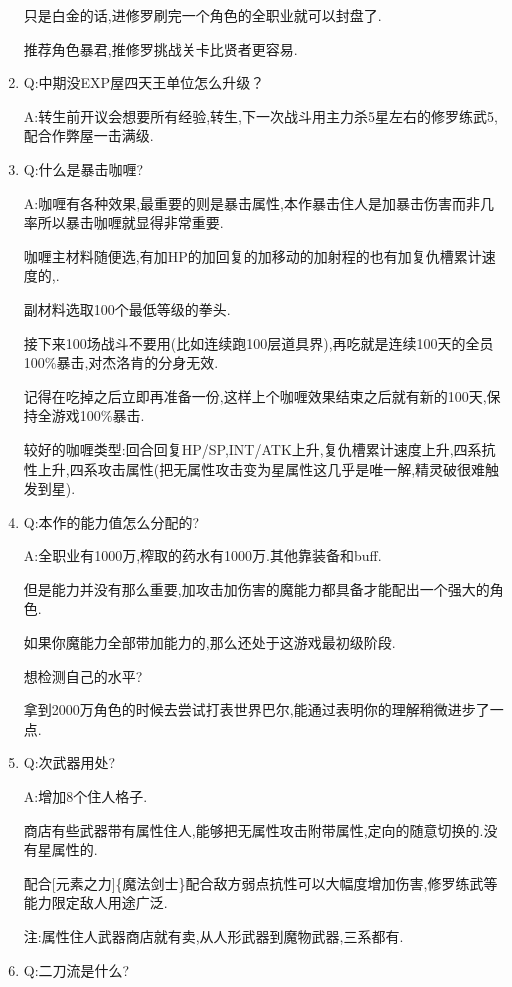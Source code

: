 \begin{enumerate}
	只是白金的话,进修罗刷完一个角色的全职业就可以封盘了.

	推荐角色暴君,推修罗挑战关卡比贤者更容易.

	\item
	Q:中期没EXP屋四天王单位怎么升级？

	A:转生前开议会想要所有经验,转生,下一次战斗用主力杀5星左右的修罗练武5,配合作弊屋一击满级.

	\item
	Q:什么是暴击咖喱?
	
	A:咖喱有各种效果,最重要的则是暴击属性,本作暴击住人是加暴击伤害而非几率所以暴击咖喱就显得非常重要.

	咖喱主材料随便选,有加HP的加回复的加移动的加射程的也有加复仇槽累计速度的,{\color{red}{也有开局自带异常状态的}}.

	副材料选取100个最低等级的拳头.

	接下来100场战斗不要用(比如连续跑100层道具界),再吃就是连续100天的全员100\%暴击,对杰洛肯的分身无效.

	记得在吃掉之后立即再准备一份,这样上个咖喱效果结束之后就有新的100天,保持全游戏100\%暴击.

	较好的咖喱类型:回合回复HP/SP,INT/ATK上升,复仇槽累计速度上升,四系抗性上升,四系攻击属性(把无属性攻击变为星属性这几乎是唯一解,精灵破很难触发到星).

	\item
	Q:本作的能力值怎么分配的?

	A:全职业有1000万,榨取的药水有1000万.其他靠装备和buff.

	但是能力并没有那么重要,加攻击加伤害的魔能力都具备才能配出一个强大的角色.

	如果你魔能力全部带加能力的,那么还处于这游戏最初级阶段.

	想检测自己的水平?

	拿到2000万角色的时候去尝试打表世界巴尔,能通过表明你的理解稍微进步了一点.

	\item
	Q:次武器用处?

	A:增加8个住人格子.

	商店有些武器带有属性住人,能够把无属性攻击附带属性,定向的随意切换的{\color{red}{精灵破}}.没有星属性的.

	配合[元素之力]\{魔法剑士\}配合敌方弱点抗性可以大幅度增加伤害,修罗练武等能力限定敌人用途广泛.

	注:属性住人武器商店就有卖,从人形武器到魔物武器,三系都有.

	\item
	Q:二刀流是什么?


\end{enumerate}
